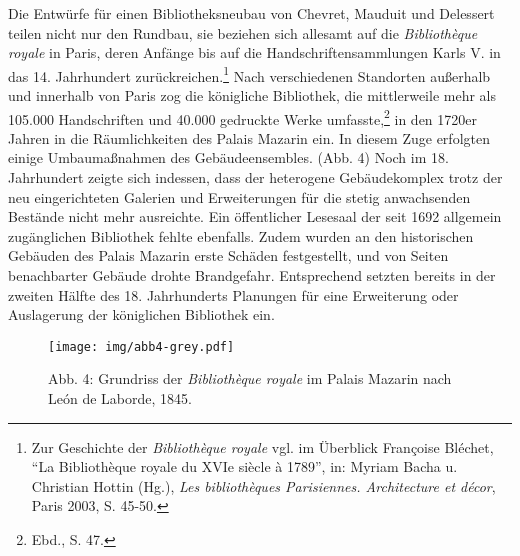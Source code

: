 Die Entwürfe für einen Bibliotheksneubau von Chevret, Mauduit und
Delessert teilen nicht nur den Rundbau, sie beziehen sich allesamt auf
die \emph{Bibliothèque royale} in Paris, deren Anfänge bis auf die
Handschriftensammlungen Karls V. in das 14. Jahrhundert
zurückreichen.\footnote{Zur Geschichte der \emph{Bibliothèque royale}
  vgl. im Überblick Françoise Bléchet, \enquote{La Bibliothèque royale
  du XVIe siècle à 1789}, in: Myriam Bacha u. Christian Hottin (Hg.),
  \emph{Les bibliothèques Parisiennes. Architecture et décor}, Paris
  2003, S. 45-50.} Nach verschiedenen Standorten außerhalb und innerhalb
von Paris zog die königliche Bibliothek, die mittlerweile mehr als
105.000 Handschriften und 40.000 gedruckte Werke umfasste,\footnote{Ebd.,
  S. 47.} in den 1720er Jahren in die Räumlichkeiten des Palais Mazarin
ein. In diesem Zuge erfolgten einige Umbaumaßnahmen des
Gebäudeensembles. (Abb. 4) Noch im 18. Jahrhundert zeigte sich indessen,
dass der heterogene Gebäudekomplex trotz der neu eingerichteten Galerien
und Erweiterungen für die stetig anwachsenden Bestände nicht mehr
ausreichte. Ein öffentlicher Lesesaal der seit 1692 allgemein
zugänglichen Bibliothek fehlte ebenfalls. Zudem wurden an den
historischen Gebäuden des Palais Mazarin erste Schäden festgestellt, und
von Seiten benachbarter Gebäude drohte Brandgefahr. Entsprechend setzten
bereits in der zweiten Hälfte des 18. Jahrhunderts Planungen für eine
Erweiterung oder Auslagerung der königlichen Bibliothek ein.

\begin{figure}[htbp]
\centering
\texttt{[image: img/abb4-grey.pdf]}
\caption*{Abb. 4: Grundriss der \emph{Bibliothèque royale} im Palais
Mazarin nach León de Laborde, 1845.}
\end{figure}

